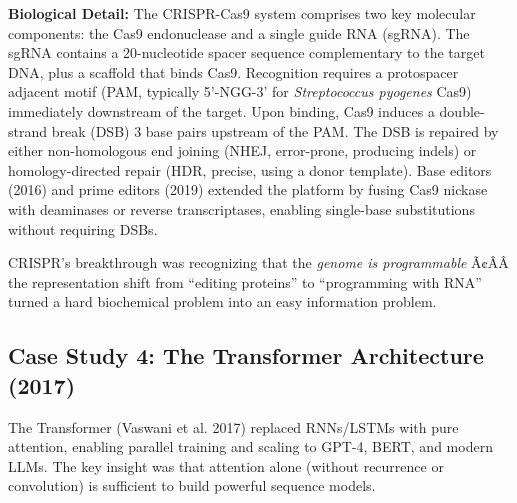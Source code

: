 \textbf{Biological Detail:} The CRISPR-Cas9 system comprises two key molecular components: the Cas9 endonuclease and a single guide RNA (sgRNA). The sgRNA contains a 20-nucleotide spacer sequence complementary to the target DNA, plus a scaffold that binds Cas9. Recognition requires a protospacer adjacent motif (PAM, typically 5'-NGG-3' for \emph{Streptococcus pyogenes} Cas9) immediately downstream of the target. Upon binding, Cas9 induces a double-strand break (DSB) 3 base pairs upstream of the PAM. The DSB is repaired by either non-homologous end joining (NHEJ, error-prone, producing indels) or homology-directed repair (HDR, precise, using a donor template). Base editors (2016) and prime editors (2019) extended the platform by fusing Cas9 nickase with deaminases or reverse transcriptases, enabling single-base substitutions without requiring DSBs.

\begin{mentalLeap}CRISPR's breakthrough was recognizing that the \emph{genome is programmable} Ã¢ÂÂ the representation shift from ``editing proteins'' to ``programming with RNA'' turned a hard biochemical problem into an easy information problem.\end{mentalLeap}

\subsection{Case Study 4: The Transformer Architecture (2017)}

The Transformer (Vaswani et al. 2017) replaced RNNs/LSTMs with pure attention, enabling parallel training and scaling to GPT-4, BERT, and modern LLMs. The key insight was that attention alone (without recurrence or convolution) is sufficient to build powerful sequence models.

